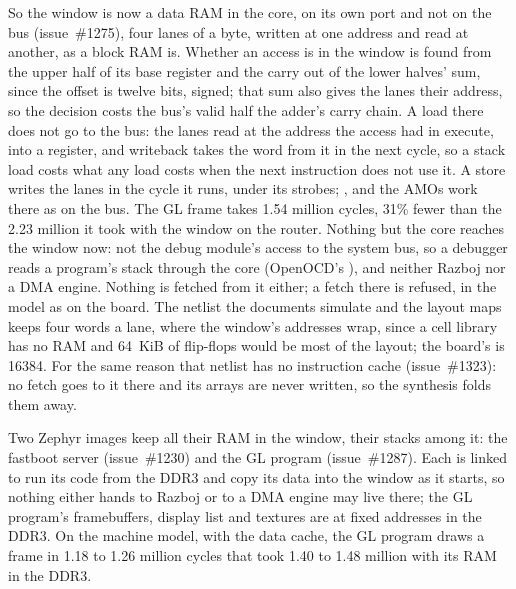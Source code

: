 \documentclass[journal,onecolumn,9pt]{IEEEtran}
\begin{document}
So the window is now a data RAM in the core, on its own port and not
on the bus (issue~\#1275), four lanes of a byte, written at one
address and read at another, as a block RAM is. Whether an access is
in the window is found from the upper half of its base register and
the carry out of the lower halves' sum, since the offset is twelve
bits, signed; that sum also gives the lanes their address, so the
decision costs the bus's valid half the adder's carry chain. A load
there does not go to the bus: the lanes read at the address the access
had in execute, into a register, and writeback takes the word from it
in the next cycle, so a stack load costs what any load costs when the
next instruction does not use it. A store writes the lanes in the
cycle it runs, under its strobes; ,  and the
AMOs work there as on the bus. The GL frame takes 1.54 million cycles,
31\% fewer than the 2.23 million it took with the window on the
router. Nothing but the core reaches the window now: not the debug
module's access to the system bus, so a debugger reads a program's
stack through the core (OpenOCD's ), and neither Razboj nor a DMA engine. Nothing is fetched from
it either; a fetch there is refused, in the model as on the board.
The netlist the documents simulate and the layout maps keeps four
words a lane, where the window's addresses wrap, since a cell library
has no RAM and 64~KiB of flip-flops would be most of the layout; the
board's is 16384. For the same reason that netlist has no instruction
cache (issue~\#1323): no fetch goes to it there and its arrays are
never written, so the synthesis folds them away.

Two Zephyr images keep all their RAM in the window, their stacks
among it: the fastboot server (issue~\#1230) and the GL program
(issue~\#1287). Each is linked to run its code from the DDR3 and copy
its data into the window as it starts, so nothing either hands to
Razboj or to a DMA engine may live there; the GL program's
framebuffers, display list and textures are at fixed addresses in the
DDR3. On the machine model, with the data cache, the GL program draws
a frame in 1.18 to 1.26 million cycles that took 1.40 to 1.48 million
with its RAM in the DDR3.
\end{document}
